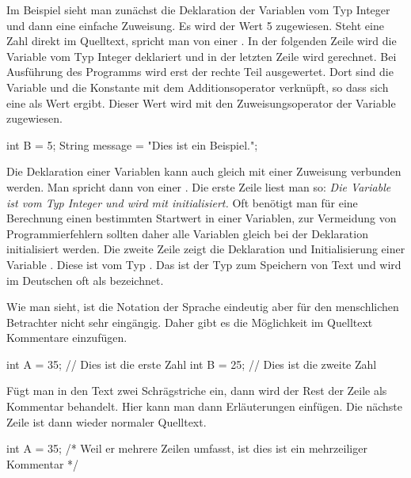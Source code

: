 Im Beispiel sieht man zunächst die Deklaration der Variablen  vom Typ Integer und dann eine einfache Zuweisung. 
Es wird der Wert 5 zugewiesen. Steht eine Zahl direkt im Quelltext, spricht man von einer . 
In der folgenden Zeile wird die Variable  vom Typ Integer deklariert und in der letzten Zeile wird gerechnet. 
Bei Ausführung des Programms wird erst der rechte Teil ausgewertet. Dort sind die Variable  und die Konstante  
mit dem Additionsoperator \code{+} verknüpft, so dass sich eine  als Wert ergibt. 
Dieser Wert wird mit den Zuweisungsoperator \code{=} der Variable  zugewiesen.

\pagebreak{}
\begin{src}
int B = 5;
String message = 
  "Dies ist ein Beispiel.";
\end{src}

Die Deklaration einer Variablen kann auch gleich mit einer Zuweisung verbunden werden. Man spricht dann von einer . 
Die erste Zeile liest man so: \textit{Die Variable  ist vom Typ Integer und wird mit  initialisiert.} 
Oft benötigt man für eine Berechnung einen bestimmten Startwert in einer Variablen, zur Vermeidung von Programmierfehlern sollten daher alle 
Variablen gleich bei der Deklaration initialisiert werden.
Die zweite Zeile zeigt die Deklaration und Initialisierung einer Variable . Diese ist vom Typ . 
Das ist der Typ zum Speichern von Text und wird im Deutschen oft als  bezeichnet. 

Wie man sieht, ist die Notation der Sprache eindeutig aber für den menschlichen Betrachter nicht sehr eingängig. 
Daher gibt es die Möglichkeit im Quelltext Kommentare einzufügen. 

\begin{src}
int A = 35; // Dies ist die erste Zahl
int B = 25; // Dies ist die zweite Zahl
\end{src}

Fügt man in den Text zwei Schrägstriche \code{//} ein, dann wird der Rest der Zeile als Kommentar behandelt. 
Hier kann man dann Erläuterungen einfügen. Die nächste Zeile ist dann wieder normaler Quelltext.

\begin{src}
int A = 35; 
/*  Weil er mehrere Zeilen 
    umfasst, ist dies ist 
    ein mehrzeiliger Kommentar
*/
\end{src}

